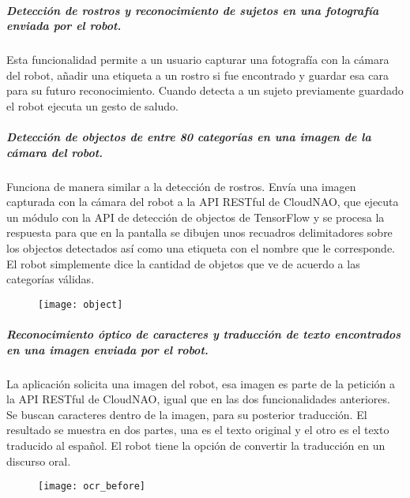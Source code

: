 \subparagraph{Detección de rostros y reconocimiento de sujetos en una fotografía enviada por el robot.}
\label{\detokenize{users_docs:deteccion-de-rostros-en-una-fotografia-enviada-por-el-robot}}
Esta funcionalidad permite a un usuario
capturar una fotografía con la cámara del robot, añadir
una etiqueta a un rostro si fue encontrado y guardar esa cara para su futuro reconocimiento.
Cuando detecta a un sujeto previamente guardado el robot ejecuta 
un gesto de saludo.

\begin{figure}[!h]
    \centering

\end{figure}


\subparagraph{Detección de objectos de entre 80 categorías en una imagen de la cámara del robot.}
\label{\detokenize{users_docs:deteccion-de-objectos-de-entre-80-categorias-en-una-imagen-de-la-camara-del-robot}}
Funciona de manera similar a la detección de rostros. Envía una imagen capturada
con la cámara del robot a la API RESTful de CloudNAO, que ejecuta un módulo
con la API de detección de objectos de TensorFlow y se procesa la respuesta para
que en la pantalla se dibujen unos
recuadros delimitadores sobre los objectos detectados así como una etiqueta
con el nombre que le corresponde. El robot simplemente
dice la cantidad de objetos que ve de acuerdo a las categorías válidas.

\begin{figure}[!h]
    \centering
	\texttt{[image: object]}%
\end{figure}


\subparagraph{Reconocimiento óptico de caracteres y traducción de texto encontrados en una imagen enviada por el robot.}
\label{\detokenize{users_docs:reconocimiento-optico-de-caracteres-y-traduccion-de-texto-encontrados-en-una-imagen-enviada-por-el-robot}}
La aplicación solicita una imagen del robot, esa imagen es parte de la petición
a la API RESTful de CloudNAO, igual que en las dos funcionalidades anteriores.
Se buscan caracteres dentro de la imagen, para su posterior traducción.
El resultado se muestra en dos partes, una es el texto original y el otro
es el texto traducido al español. El robot tiene la opción de convertir la
traducción en un discurso oral.

\begin{figure}[!h]
    \centering
    \texttt{[image: ocr\_before]}

\end{figure}


